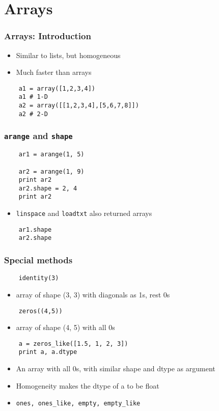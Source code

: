 \section{Arrays}

\begin{frame}[fragile]
  \frametitle{Arrays: Introduction}
  \begin{itemize}
  \item Similar to lists, but homogeneous
  \item Much faster than arrays
  \end{itemize}
  \begin{lstlisting}
    a1 = array([1,2,3,4])
    a1 # 1-D
    a2 = array([[1,2,3,4],[5,6,7,8]])
    a2 # 2-D
  \end{lstlisting}
\end{frame}

\begin{frame}[fragile]
  \frametitle{\texttt{arange} and \texttt{shape}}
  \begin{lstlisting}
    ar1 = arange(1, 5)

    ar2 = arange(1, 9) 
    print ar2
    ar2.shape = 2, 4
    print ar2
  \end{lstlisting}
  \begin{itemize}
  \item \texttt{linspace} and \texttt{loadtxt} also returned arrays
  \end{itemize}
  \begin{lstlisting}
    ar1.shape
    ar2.shape
  \end{lstlisting}
\end{frame}

\begin{frame}[fragile]
  \frametitle{Special methods}
  \begin{lstlisting}
    identity(3)
  \end{lstlisting}
  \begin{itemize}
  \item array of shape (3, 3) with diagonals as 1s, rest 0s
  \end{itemize}
  \begin{lstlisting}
    zeros((4,5))
  \end{lstlisting}
  \begin{itemize}
  \item array of shape (4, 5) with all 0s
  \end{itemize}
  \begin{lstlisting}
    a = zeros_like([1.5, 1, 2, 3])
    print a, a.dtype
  \end{lstlisting}
  \begin{itemize}
  \item An array with all 0s, with similar shape and dtype as argument
  \item Homogeneity makes the dtype of a to be float
  \item \texttt{ones, ones\_like, empty, empty\_like}
  \end{itemize}
\end{frame}


